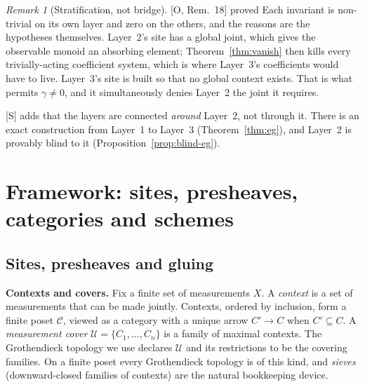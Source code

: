 \documentclass[11pt]{article}
\theoremstyle{definition}
\theoremstyle{remark}
\newtheorem{remark}[theorem]{Remark}
\newcommand{\src}[1]{\textsf{\small[#1]}}
\newcommand{\st}[1]{\textsf{\small\color{gray}#1}}
\begin{document}
\begin{remark}[Stratification, not bridge]
\src{O, Rem.~18} \st{proved}
Each invariant is non-trivial on its own layer and zero on the others, and the reasons are the hypotheses themselves. Layer~2's site has a global joint, which gives the observable monoid an absorbing element; Theorem~\ref{thm:vanish} then kills every trivially-acting coefficient system, which is where Layer~3's coefficients would have to live. Layer~3's site is built so that no global context exists. That is what permits $\gamma\neq0$, and it simultaneously denies Layer~2 the joint it requires.

\src{S} adds that the layers are connected \emph{around} Layer~2, not through it. There is an exact construction from Layer~1 to Layer~3 (Theorem~\ref{thm:eg}), and Layer~2 is provably blind to it (Proposition~\ref{prop:blind-eg}).
\end{remark}

\section{Framework: sites, presheaves, categories and schemes}\label{sec:framework}
\noindent{}

\subsection{Sites, presheaves and gluing}
\textbf{Contexts and covers.} Fix a finite set of measurements $X$. A \emph{context} is a set of measurements that can be made jointly. Contexts, ordered by inclusion, form a finite poset $\mathcal C$, viewed as a category with a unique arrow $C'\to C$ when $C'\subseteq C$. A \emph{measurement cover} $\mathcal U=\{C_1,\dots,C_n\}$ is a family of maximal contexts. The Grothendieck topology we use declares $\mathcal U$ and its restrictions to be the covering families. On a finite poset every Grothendieck topology is of this kind, and \emph{sieves} (downward-closed families of contexts) are the natural bookkeeping device.
\end{document}
